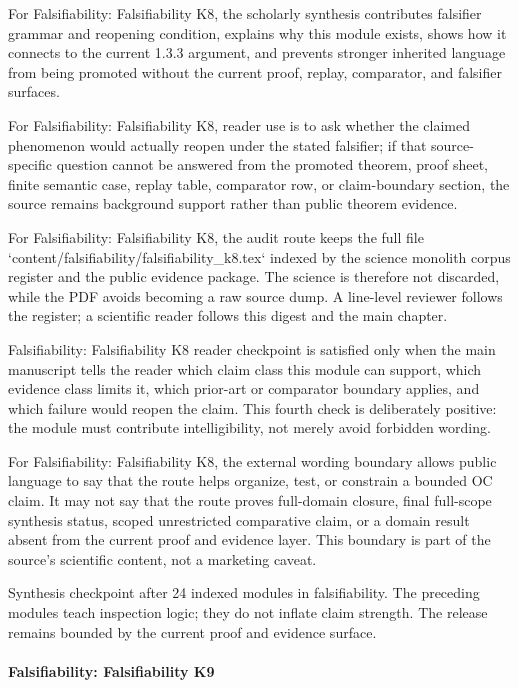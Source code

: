 For Falsifiability: Falsifiability K8, the scholarly synthesis contributes falsifier grammar and reopening condition, explains why this module exists, shows how it connects to the current 1.3.3 argument, and prevents stronger inherited language from being promoted without the current proof, replay, comparator, and falsifier surfaces.


For Falsifiability: Falsifiability K8, reader use is to ask whether the claimed phenomenon would actually reopen under the stated falsifier; if that source-specific question cannot be answered from the promoted theorem, proof sheet, finite semantic case, replay table, comparator row, or claim-boundary section, the source remains background support rather than public theorem evidence.


For Falsifiability: Falsifiability K8, the audit route keeps the full file `content/falsifiability/falsifiability\_k8.tex` indexed by the science monolith corpus register and the public evidence package. The science is therefore not discarded, while the PDF avoids becoming a raw source dump. A line-level reviewer follows the register; a scientific reader follows this digest and the main chapter.


Falsifiability: Falsifiability K8 reader checkpoint is satisfied only when the main manuscript tells the reader which claim class this module can support, which evidence class limits it, which prior-art or comparator boundary applies, and which failure would reopen the claim. This fourth check is deliberately positive: the module must contribute intelligibility, not merely avoid forbidden wording.


For Falsifiability: Falsifiability K8, the external wording boundary allows public language to say that the route helps organize, test, or constrain a bounded OC claim. It may not say that the route proves full-domain closure, final full-scope synthesis status, scoped unrestricted comparative claim, or a domain result absent from the current proof and evidence layer. This boundary is part of the source's scientific content, not a marketing caveat.


Synthesis checkpoint after 24 indexed modules in falsifiability. The preceding modules teach inspection logic; they do not inflate claim strength. The release remains bounded by the current proof and evidence surface.


\paragraph{Falsifiability: Falsifiability K9}

